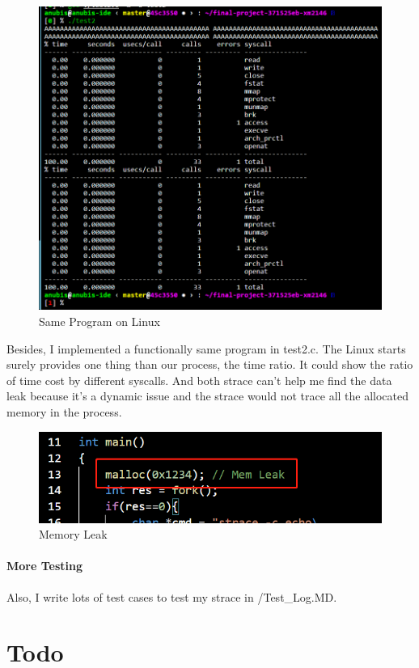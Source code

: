 \documentclass[11pt,oneside,a4paper]{article}
\begin{document}
\begin{figure}[H]
    \includegraphics[width=4.75in]{1-43.png}
    \centering
    \caption{Same Program on Linux}
\end{figure}

Besides, I implemented a functionally same program in test2.c. The Linux starts surely provides one 
thing than our process, the time ratio. It could show the ratio of time cost by different syscalls.
And both strace can't help me find the data leak because it's a dynamic issue and the strace would not
trace all the allocated memory in the process.

\begin{figure}[H]
    \includegraphics[width=4.75in]{1-44.png}
    \centering
    \caption{Memory Leak}
\end{figure}

\paragraph*{More Testing}
Also, I write lots of test cases to test my strace in /Test\_Log.MD.

\section{Todo}
\end{document}
